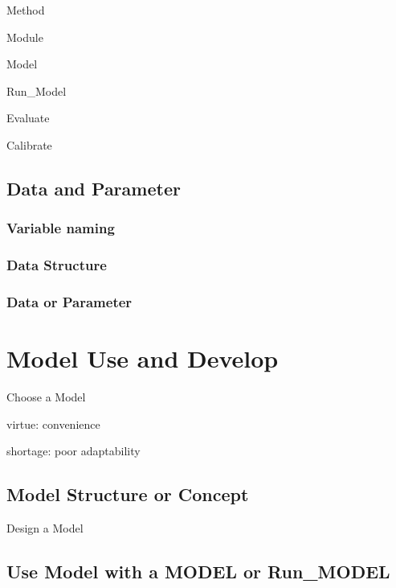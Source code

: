 \documentclass[
]{book}
\begin{document}
Method

Module

Model

Run\_Model

Evaluate

Calibrate

\hypertarget{data-and-parameter}{%
\section{Data and Parameter}\label{data-and-parameter}}

\hypertarget{variable-naming}{%
\subsection{Variable naming}\label{variable-naming}}

\hypertarget{data-structure}{%
\subsection{Data Structure}\label{data-structure}}

\hypertarget{data-or-parameter}{%
\subsection{Data or Parameter}\label{data-or-parameter}}

\hypertarget{develop}{%
\chapter{Model Use and Develop}\label{develop}}

Choose a Model

virtue: convenience

shortage: poor adaptability

\hypertarget{model-structure-or-concept}{%
\section{Model Structure or Concept}\label{model-structure-or-concept}}

Design a Model

\hypertarget{use-model-with-a-model-or-run_model}{%
\section{Use Model with a MODEL or Run\_MODEL}\label{use-model-with-a-model-or-run_model}}
\end{document}
